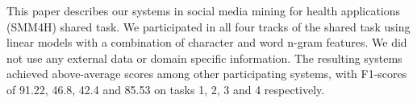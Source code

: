 This paper describes our systems in social media mining for health applications (SMM4H) shared task. We participated in all four tracks of the shared task using linear models with a combination of character and word n-gram features. We did not use any external data or domain specific information. The resulting systems achieved above-average scores among other participating systems, with F1-scores of 91.22, 46.8, 42.4 and 85.53 on tasks 1, 2, 3 and 4 respectively.
